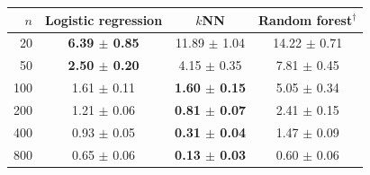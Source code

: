 \begin{tabular}{rccc}
\toprule
$n$ & Logistic regression & $k$NN & Random forest$^\dagger$ \\
\midrule
20 & \textbf{6.39 $\pm$ 0.85} & 11.89 $\pm$ 1.04 & 14.22 $\pm$ 0.71 \\
50 & \textbf{2.50 $\pm$ 0.20} & 4.15 $\pm$ 0.35 & 7.81 $\pm$ 0.45 \\
100 & 1.61 $\pm$ 0.11 & \textbf{1.60 $\pm$ 0.15} & 5.05 $\pm$ 0.34 \\
200 & 1.21 $\pm$ 0.06 & \textbf{0.81 $\pm$ 0.07} & 2.41 $\pm$ 0.15 \\
400 & 0.93 $\pm$ 0.05 & \textbf{0.31 $\pm$ 0.04} & 1.47 $\pm$ 0.09 \\
800 & 0.65 $\pm$ 0.06 & \textbf{0.13 $\pm$ 0.03} & 0.60 $\pm$ 0.06 \\
\bottomrule
\end{tabular}
